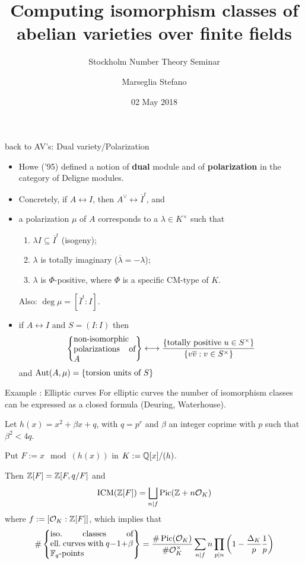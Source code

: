 \documentclass{beamer}
\title[]{Computing isomorphism classes of abelian varieties over finite fields}
\subtitle{Stockholm Number Theory Seminar}
\author[Marseglia Stefano]{Marseglia Stefano}
\institute[]{Stockholms University}
\date{02 May 2018}
\begin{document}
 

\begin{frame}{ back to AV's: Dual variety/Polarization }
\begin{itemize}
 \item Howe ('95) defined a notion of \textbf{dual} module and of \textbf{polarization} in the category of Deligne modules.
\pause \item Concretely, if $A\leftrightarrow I$, then $A^\vee \leftrightarrow \overline{I}^t$, and
\pause \item a polarization $\mu$ of $A$ corresponds to a $\lambda\in K^\times$ such that
      \begin{enumerate}[-]
       \item $\lambda I \subseteq \overline{I}^t$ (isogeny);
       \item $\lambda$ is totally imaginary ($\overline \lambda = -\lambda$);
       \item $\lambda$ is $\Phi$-positive, where $\Phi$ is a specific CM-type of $K$.
      \end{enumerate} 
      Also: $\deg \mu= [\overline{I}^t : I]$.
\pause  \item if $A \leftrightarrow I$ and $S=(I:I)$ then
  \[\set{\parbox[p]{7.5em}{non-isomorphic polarizations of $A$}} \longleftrightarrow \dfrac{\set{\text{totally positive }u\in S^\times }}{\set{v\overline{v}: v\in S^\times}}\]
  and $\operatorname{Aut}(A,\mu) = \left\lbrace\text{torsion units of $S$}\right\rbrace$
\end{itemize}
\end{frame}

\begin{frame}{ Example : Elliptic curves }
 For elliptic curves the number of isomorphism classes can be expressed as a closed formula (Deuring, Waterhouse).
 
 Let $h(x)=x^2+\beta x +q$, with $q=p^r$ and $\beta$ an integer coprime with $p$ such that $\beta^2<4q$.
 
 Put $F:=x \mod (h(x))$ in $K:=\mathbb{Q}[x]/(h)$.
 
 Then $\mathbb{Z}[F]=\mathbb{Z}[F,q/F]$ and
 \[\operatorname{ICM}(\mathbb{Z}[F]) = \bigsqcup_{n|f} \operatorname{Pic}(\mathbb{Z}+n{\mathcal O}_K) \]
 where $f:=[{\mathcal O}_K:\mathbb{Z}[F]]$, which implies that
 \[
 \#\set{\parbox[p]{10em}{ iso.~classes of ell.~curves with $q-1+\beta$ $\F_q$-points }} =
 \dfrac{\#\Pic(\cO_K)}{\#\cO_K^\times} \sum_{n|f} n\prod_{p|n}\left( 1-\dfrac{\Delta_K}{p}\dfrac{1}{p} \right) \]
\end{frame}
\end{document}
